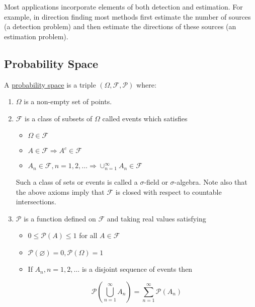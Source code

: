 \documentclass[12pt,thmsa]{article}
\let\emptyset\varnothing
\begin{document}
Most applications incorporate elements of both detection and estimation. For example, in direction finding most methods first estimate the number of sources (a detection problem) and then estimate the directions of these sources (an estimation problem).


\subsection{Probability Space}

A \underline{probability space} is a triple $(\Omega, \mathcal{F}, \mathcal{P})$ where:

\begin{enumerate}
	\item $\Omega$ is a non-empty set of points.
	\item $\mathcal{F}$ is a class of subsets of $\Omega$ called events which satisfies


	\begin{itemize}
		\item $\Omega \in \mathcal{F}$
		\item $A \in \mathcal{F} \Rightarrow A^{c} \in \mathcal{F}$
		\item $A_{n} \in \mathcal{F}, n=1,2, \ldots \Rightarrow \cup_{n=1}^{\infty} A_{n} \in \mathcal{F}$
	\end{itemize}
	
	Such a class of sets or events is called a $\sigma$-field or $\sigma$-algebra. Note also that the above axioms imply that $\mathcal{F}$ is closed with respect to countable intersections.\\
	
	\item $\mathcal{P}$ is a function defined on $\mathcal{F}$ and taking real values satisfying

	\begin{itemize}
		\item $0 \leq \mathcal{P}(A) \leq 1$ for all $A \in \mathcal{F}$
		\item $\mathcal{P}(\emptyset)=0, \mathcal{P}(\Omega)=1$
		\item If $A_{n}, n=1,2, \ldots$ is a disjoint sequence of events then
	\end{itemize}
	
	\[
	\mathcal{P}\left(\bigcup_{n=1}^{\infty} A_{n}\right)=\sum_{n=1}^{\infty} \mathcal{P}\left(A_{n}\right)
	\]
	
\end{enumerate}
\end{document}
